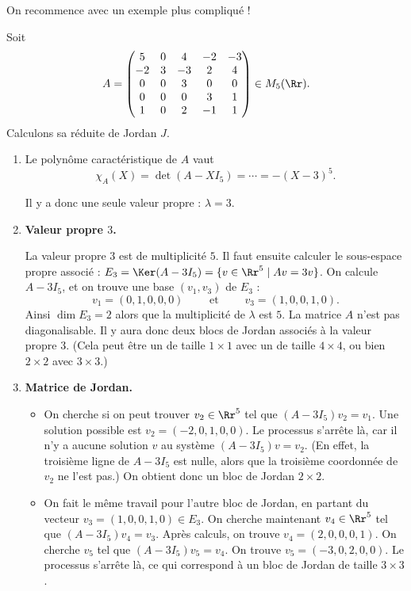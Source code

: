 \documentclass[12pt, class=report,crop=false]{standalone}
\begin{document}
\bigskip

On recommence avec un exemple plus compliqué !

\begin{exemple}
Soit 
$$A = \begin{pmatrix}
5 & 0 & 4 & -2 & -3 \\
-2 & 3 & -3 & 2 & 4 \\
0 & 0 & 3 & 0 & 0 \\
0 & 0 & 0 & 3 & 1 \\
1 & 0 & 2 & -1 & 1
\end{pmatrix}
\in M_5(\Rr).$$
Calculons sa réduite de Jordan $J$.

\begin{enumerate}
  \item Le polynôme caractéristique de $A$ vaut
  $$\chi_A(X) = \det(A-XI_5) = \cdots = -(X-3)^5.$$
  
  Il y a donc une seule valeur propre : $\lambda = 3$.
  
  \item \textbf{Valeur propre $3$.}
  
  La valeur propre $3$ est de multiplicité $5$. 
  Il faut ensuite calculer le sous-espace propre associé : 
  $E_{3} = \Ker(A-3I_5) = \{ v \in \Rr^5 \mid Av = 3v\}$.
  On calcule $A-3I_5$, et on trouve une base $(v_1,v_3)$ de $E_3$ :
  $$v_1 =(0,1,0,0,0) \qquad \text{ et } \qquad  v_3 = (1,0,0,1,0).$$
  Ainsi $\dim E_3 = 2$ alors que la multiplicité de $\lambda$ est $5$. La matrice $A$ n'est pas diagonalisable. 
  Il y aura donc deux blocs de Jordan associés à la valeur propre $3$. (Cela peut être un de taille $1\times1$ avec un de taille $4\times 4$, ou bien $2\times 2$ avec $3\times 3$.)
  
  
  \item \textbf{Matrice de Jordan.}

  \begin{itemize}
    \item On cherche si on peut trouver $v_2 \in \Rr^5$ tel que $(A-3I_5)v_2 = v_1$.
  Une solution possible est $v_2 = (-2,0,1,0,0)$.
  Le processus s'arrête là, car il n'y a aucune solution $v$ au système $(A-3I_5)v=v_2$.
  (En effet, la troisième ligne de $A-3I_5$ est nulle, alors que la troisième coordonnée de $v_2$ ne l'est pas.) On obtient donc un bloc de Jordan $2\times2$.  
  
    \item On fait le même travail pour l'autre bloc de Jordan, en partant du
    vecteur $v_3 =  (1,0,0,1,0) \in E_3$.    
     On cherche maintenant $v_4 \in \Rr^5$ tel que $(A-3I_5)v_4 = v_3$.
    Après calculs, on trouve $v_4 = (2, 0, 0, 0, 1)$. 
    On cherche $v_5$ tel que $(A-3I_5)v_5 = v_4$. On trouve
    $v_5 = (-3, 0, 2, 0, 0)$. Le processus s'arrête là, ce qui correspond à un bloc de Jordan de taille 
    $3\times 3$.
    

\end{itemize}
\end{enumerate}
\end{exemple}
\end{document}
